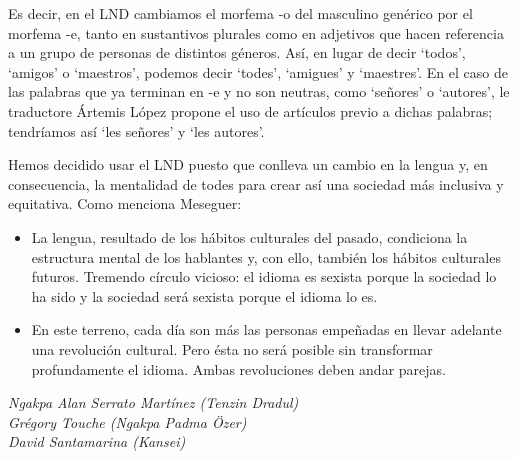 \documentclass[12pt,openany]{book}
\begin{document}
Es decir, en el LND cambiamos el morfema -o del masculino genérico por el morfema -e, tanto en sustantivos plurales como en adjetivos que hacen referencia a un grupo de personas de distintos géneros. Así, en lugar de decir `todos', `amigos' o `maestros', podemos decir `todes', `amigues' y `maestres'. En el caso de las palabras que ya terminan en -e y no son neutras, como `señores' o `autores', le traductore Ártemis López propone el uso de artículos previo a dichas palabras; tendríamos así `les señores' y `les autores'.

Hemos decidido usar el LND puesto que conlleva un cambio en la lengua y, en consecuencia, la mentalidad de todes para crear así una sociedad más inclusiva y equitativa. Como menciona Meseguer:

\begin{itemize}
\setlength\itemsep{-0.3em}
  \item La lengua, resultado de los hábitos culturales del pasado, condiciona la estructura mental de los hablantes y, con ello, también los hábitos culturales futuros. Tremendo círculo vicioso: el idioma es sexista porque la sociedad lo ha sido y la sociedad será sexista porque el idioma lo es.
  \item En este terreno, cada día son más las personas empeñadas en llevar adelante una revolución cultural. Pero ésta no será posible sin transformar profundamente el idioma. Ambas revoluciones deben andar parejas.
\end{itemize}

\textit{Ngakpa Alan Serrato Martínez (Tenzin Dradul)} \\
\textit{Grégory Touche (Ngakpa Padma Özer)} \\
\textit{David Santamarina (Kansei)}

\begin{figure}[h]
    \centering
\end{figure}
\end{document}
